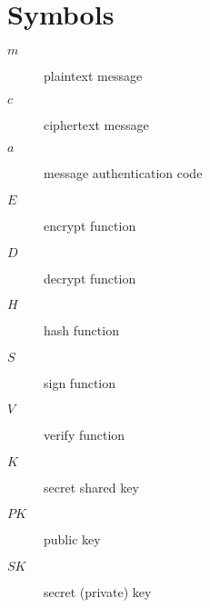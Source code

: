 \chapter{Symbols}

\begin{description}
  \item[$m$] plaintext message
  \item[$c$] ciphertext message
  \item[$a$] message authentication code
  \item[$E$] encrypt function
  \item[$D$] decrypt function
  \item[$H$] hash function
  \item[$S$] sign function
  \item[$V$] verify function
  \item[$K$] secret shared key
  \item[$PK$] public key
  \item[$SK$] secret (private) key
\end{description}
